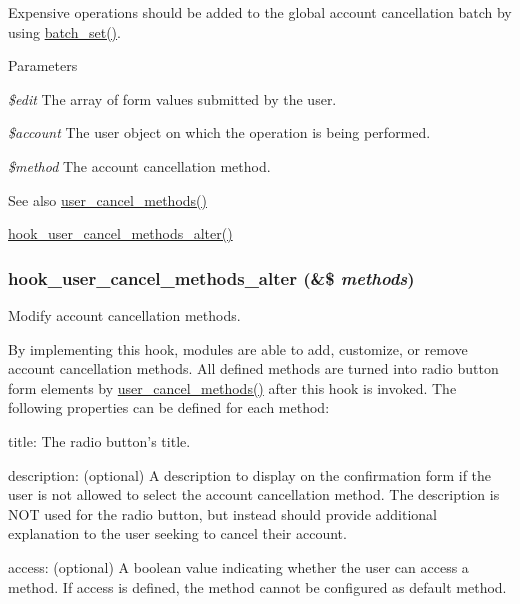 Expensive operations should be added to the global account cancellation batch by using \hyperlink{group__batch_ga9ff3f18b3bdd1d62ab7ac681a22a7170}{batch\_\-set()}.


\begin{DoxyParams}{Parameters}
\item[{\em \$edit}]The array of form values submitted by the user. \item[{\em \$account}]The user object on which the operation is being performed. \item[{\em \$method}]The account cancellation method.\end{DoxyParams}
\begin{DoxySeeAlso}{See also}
\hyperlink{user_8pages_8inc_a11f0201b4e77086622c55fd3ed13bb93}{user\_\-cancel\_\-methods()} 

\hyperlink{group__hooks_gadbac37235bb01361bf8b3d375ea417a5}{hook\_\-user\_\-cancel\_\-methods\_\-alter()} 
\end{DoxySeeAlso}
\hypertarget{group__hooks_gadbac37235bb01361bf8b3d375ea417a5}{
\subsubsection[{hook\_\-user\_\-cancel\_\-methods\_\-alter}]{\setlength{\rightskip}{0pt plus 5cm}hook\_\-user\_\-cancel\_\-methods\_\-alter (\&\$ {\em methods})}}
\label{group__hooks_gadbac37235bb01361bf8b3d375ea417a5}
Modify account cancellation methods.

By implementing this hook, modules are able to add, customize, or remove account cancellation methods. All defined methods are turned into radio button form elements by \hyperlink{user_8pages_8inc_a11f0201b4e77086622c55fd3ed13bb93}{user\_\-cancel\_\-methods()} after this hook is invoked. The following properties can be defined for each method:
\begin{DoxyItemize}
\item title: The radio button's title.
\item description: (optional) A description to display on the confirmation form if the user is not allowed to select the account cancellation method. The description is NOT used for the radio button, but instead should provide additional explanation to the user seeking to cancel their account.
\item access: (optional) A boolean value indicating whether the user can access a method. If access is defined, the method cannot be configured as default method.
\end{DoxyItemize}


